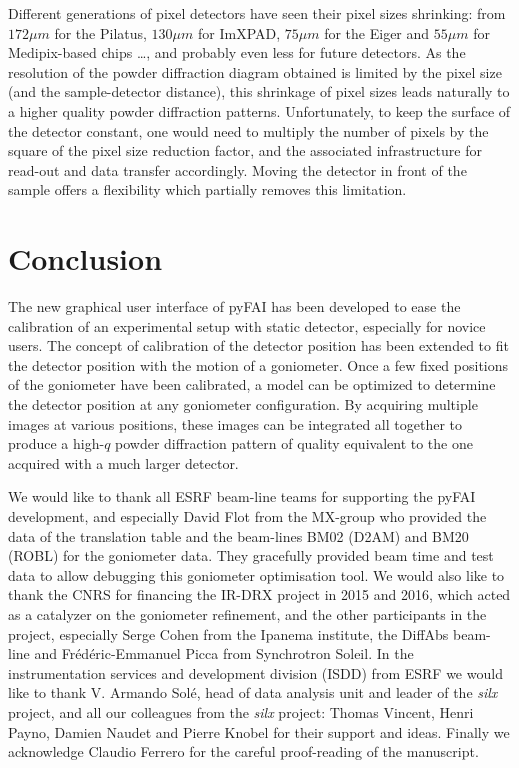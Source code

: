 \documentclass[preprint, pdf]{iucr}              %
\begin{document}
Different generations of pixel detectors have seen their pixel sizes
shrinking:
from $172 \mu m$ for the Pilatus, $130 \mu m$ for ImXPAD, $75 \mu m$ for the
Eiger and $55 \mu m$ for Medipix-based chips \ldots, and probably even less for
future detectors.
As the resolution of the powder diffraction diagram obtained is limited by the
pixel size (and the sample-detector distance), this shrinkage of
pixel sizes leads naturally to a higher quality powder
diffraction patterns.
Unfortunately, to keep the surface of the detector constant, one would need
to multiply the number of pixels by the square of the pixel size reduction
factor, and the associated infrastructure for read-out and data transfer
accordingly.
Moving the detector in front of the sample offers a flexibility which
partially removes this limitation.

\section{Conclusion}

The new graphical user interface of pyFAI has been developed to ease the
calibration of an experimental setup with static detector, especially for
novice users.
The concept of calibration of the detector position has been extended to fit
the detector position with the motion of a goniometer.   
Once a few fixed positions of the goniometer have been calibrated, a model can
be optimized to determine the detector position at any goniometer
configuration.
By acquiring multiple images at various positions, these images can be
integrated all together to produce a high-$q$ powder diffraction pattern of
quality equivalent to the one acquired with a much larger detector. 
 

We would like to thank all ESRF beam-line teams for supporting the
pyFAI development, and especially David Flot from the MX-group who provided the
data of the translation table and the beam-lines BM02 (D2AM) and BM20
(ROBL) for the goniometer data. 
They gracefully provided beam time and test data to allow debugging this 
goniometer optimisation tool.
We would also like to thank the CNRS for financing the IR-DRX project
in 2015 and 2016, which acted as a catalyzer on the goniometer refinement,
and the other participants in the project, especially Serge Cohen from the
Ipanema institute, the DiffAbs beam-line and Frédéric-Emmanuel Picca from
Synchrotron Soleil.
In the instrumentation services and development division (ISDD) from ESRF  we
would like to thank V. Armando Solé, head of data analysis unit and leader of 
the \textit{silx} project, and all our colleagues from the \textit{silx}
project:
Thomas Vincent, Henri Payno, Damien Naudet and  Pierre Knobel for their support and ideas. 
Finally we acknowledge Claudio Ferrero for the careful proof-reading of the
manuscript. 



\end{document}
